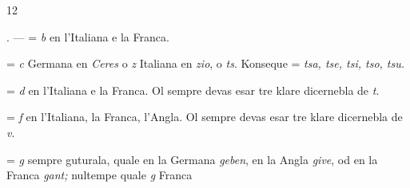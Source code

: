 \begin{VUpage}[16]{12}
\VUblancAlinea
\VUsaut{6.49mm}
\VUsaut{3.65mm}

. ---  = \textit{b} en l'Italiana e la Franca.

\VUblanc{2.82pt}%
 = \textit{c} Germana en \textit{Ceres} o \textit{z} Italiana en \textit{zio}, o \textit{ts}. Konseque\nl
{} = \textit{tsa, tse, tsi, tso, tsu.}

\VUblancAlinea
{} = \textit{d} en l'Italiana e la Franca. Ol sempre devas esar\nl
tre klare dicernebla de \textit{t}.

\VUblancAlinea
{} = \textit{f} en l'Italiana, la Franca, l'Angla. Ol sempre devas\nl
esar tre klare dicernebla de \textit{v}.

\VUblancAlinea

\VUblancAlinea
{} = \textit{g} sempre guturala, quale en la Germana \textit{geben}, en la\nl
Angla \textit{give}, od en la Franca \textit{gant;} nultempe quale \textit{g} Franca
\parplein
\end{VUpage}

